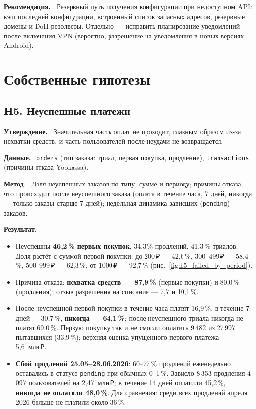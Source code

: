 \documentclass[11pt,a4paper]{article}
\newcommand{\hblock}[1]{\par\smallskip\noindent\textbf{#1.}~}
\begin{document}
\hblock{Рекомендация} Резервный путь получения конфигурации при недоступном API: кэш последней конфигурации, встроенный список запасных адресов, резервные домены и DoH-резолверы. Отдельно --- исправить планирование уведомлений после включения VPN (вероятно, разрешение на уведомления в новых версиях Android).

\section{Собственные гипотезы}

\subsection{H5. Неуспешные платежи}

\hblock{Утверждение} Значительная часть оплат не проходит, главным образом из-за нехватки средств, и часть пользователей после неудачи не возвращается.

\hblock{Данные} \texttt{orders} (тип заказа: триал, первая покупка, продление), \texttt{transactions} (причины отказа Yookassa).

\hblock{Метод} Доля неуспешных заказов по типу, сумме и периоду; причины отказа; что происходит после неуспешного заказа (оплата в течение часа, 7 дней, никогда --- только заказы старше 7 дней); недельная динамика зависших (\texttt{pending}) заказов.

\hblock{Результат}
\begin{itemize}
  \item Неуспешны \textbf{46,2\,\% первых покупок}, 34,3\,\% продлений, 41,3\,\% триалов. Доля растёт с суммой первой покупки: до 200\,₽ --- 42,6\,\%, 300--499\,₽ --- 58,4\,\%, 500--999\,₽ --- 62,3\,\%, от 1000\,₽ --- 92,7\,\% (рис.~\ref{fig:h5_failed_by_period}).
  \item Причина отказа: \textbf{нехватка средств --- 87,9\,\%} (первые покупки) и 80,0\,\% (продления); отзыв разрешения на списание --- 7,7 и 10,1\,\%.
  \item После неуспешной первой покупки в течение часа платят 16,9\,\%, в течение 7 дней --- 30,7\,\%, \textbf{никогда --- 64,1\,\%}; после неуспешного триала никогда не платят 69,0\,\%. Первую покупку так и не смогли оплатить 9\,482 из 27\,997 пытавшихся (33,9\,\%); верхняя оценка упущенного первого платежа --- 5,6~млн\,₽.
  \item \textbf{Сбой продлений 25.05--28.06.2026}: 60--77\,\% продлений еженедельно оставались в статусе \texttt{pending} при обычных 0--1\,\%. Зависло 8\,353 продления 4\,097 пользователей на 2,47~млн\,₽; в течение 14 дней оплатили 45,2\,\%, \textbf{никогда не оплатили 48,0\,\%}. Для сравнения: среди всех продлений апреля 2026 больше не платили около 36\,\%.
\end{itemize}
\end{document}

